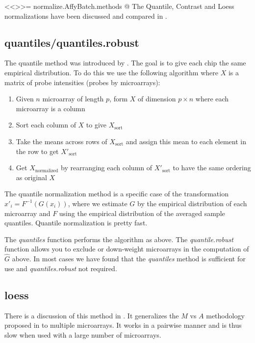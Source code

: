 {<<>>=
normalize.AffyBatch.methods
@
The Quantile, Contrast and Loess normalizations have been discussed and compared in \cite{PMID_12538238}.

\subsection{quantiles/quantiles.robust}

The quantile method was introduced by \cite{PMID_12538238}. The goal is to give each chip the same empirical distribution. To do this we use the following algorithm where $X$ is a matrix of probe intensities (probes by microarrays):

\begin{enumerate}
\item Given $n$ microarray of length $p$, form $X$  of dimension $p \times n$  where
each microarray is a column
\item Sort each column of $X$ to give $X_{\mbox{sort}}$
\item Take the means across rows of $X_{\mbox{sort}}$ and assign this mean to each element in the row to get $X'_{\mbox{sort}}$
\item Get $X_{\mbox{normalized}}$ by rearranging each column of $X'_{\mbox{sort}}$ to have the same ordering as original $X$
\end{enumerate}

The quantile normalization method is a specific case of the transformation $x'_{i} = F^{-1}\left(G\left(x_{i}\right)\right)$, where we estimate $G$ by the empirical distribution of each microarray and $F$ using the empirical distribution of the averaged sample quantiles.  Quantile normalization is pretty fast.

The \emph{quantiles} function performs the algorithm as above. The \emph{quantile.robust} function allows you to exclude or down-weight microarrays in the computation of $\hat G$ above. In most cases we have found that the \emph{quantiles} method is sufficient for use and \emph{quantiles.robust} not required.

\subsection{loess}

There is a discussion of this method in \cite{PMID_12538238}. It generalizes the $M$ vs $A$ methodology proposed in \cite{Dudoit:2002} to multiple microarrays. It works in a pairwise manner and is thus slow when used with a large number of microarrays.

}
